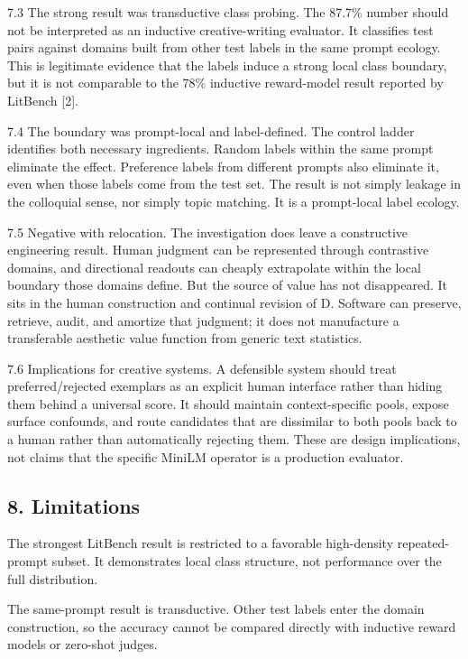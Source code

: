 \documentclass[
]{article}
\begin{document}
7.3 The strong result was transductive class probing. The 87.7\% number
should not be interpreted as an inductive creative-writing evaluator. It
classifies test pairs against domains built from other test labels in
the same prompt ecology. This is legitimate evidence that the labels
induce a strong local class boundary, but it is not comparable to the
78\% inductive reward-model result reported by LitBench {[}2{]}.

7.4 The boundary was prompt-local and label-defined. The control ladder
identifies both necessary ingredients. Random labels within the same
prompt eliminate the effect. Preference labels from different prompts
also eliminate it, even when those labels come from the test set. The
result is not simply leakage in the colloquial sense, nor simply topic
matching. It is a prompt-local label ecology.

7.5 Negative with relocation. The investigation does leave a
constructive engineering result. Human judgment can be represented
through contrastive domains, and directional readouts can cheaply
extrapolate within the local boundary those domains define. But the
source of value has not disappeared. It sits in the human construction
and continual revision of D. Software can preserve, retrieve, audit, and
amortize that judgment; it does not manufacture a transferable aesthetic
value function from generic text statistics.

7.6 Implications for creative systems. A defensible system should treat
preferred/rejected exemplars as an explicit human interface rather than
hiding them behind a universal score. It should maintain
context-specific pools, expose surface confounds, and route candidates
that are dissimilar to both pools back to a human rather than
automatically rejecting them. These are design implications, not claims
that the specific MiniLM operator is a production evaluator.

\subsection{8. Limitations}\label{limitations}

The strongest LitBench result is restricted to a favorable high-density
repeated-prompt subset. It demonstrates local class structure, not
performance over the full distribution.

The same-prompt result is transductive. Other test labels enter the
domain construction, so the accuracy cannot be compared directly with
inductive reward models or zero-shot judges.
\end{document}
